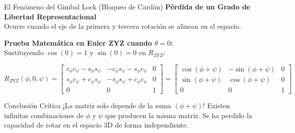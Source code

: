 \documentclass[aspectratio=169]{beamer}
\begin{document}
\begin{frame}{El Fenómeno del Gimbal Lock (Bloqueo de Cardán)}
    \textbf{Pérdida de un Grado de Libertad Representacional}\\
    Ocurre cuando el eje de la primera y tercera rotación se alinean en el espacio.
    
    \vspace{0.2cm}
    \textbf{Prueba Matemática en Euler ZYZ cuando $\theta = 0$:} \\
    Sustituyendo $\cos(0) = 1$ y $\sin(0) = 0$ en $R_{ZYZ}$:
    
    \begin{equation*}
        R_{ZYZ}(\phi, 0, \psi) = \begin{bmatrix}      
        c_\phi c_\psi - s_\phi s_\psi & -c_\phi s_\psi - s_\phi c_\psi & 0 \\      
        s_\phi c_\psi + c_\phi s_\psi & -s_\phi s_\psi + c_\phi c_\psi & 0 \\      
        0 & 0 & 1      
        \end{bmatrix} 
        = \begin{bmatrix}      
        \cos(\phi + \psi) & -\sin(\phi + \psi) & 0 \\      
        \sin(\phi + \psi) &  \cos(\phi + \psi) & 0 \\      
        0 & 0 & 1      
        \end{bmatrix}
    \end{equation*}
    
    \vspace{0.2cm}
    \begin{alertblock}{Conclusión Crítica}
        ¡La matriz solo depende de la suma $(\phi + \psi)$! Existen infinitas combinaciones de $\phi$ y $\psi$ que producen la misma matriz. Se ha perdido la capacidad de rotar en el espacio 3D de forma independiente.
    \end{alertblock}
\end{frame}
\end{document}
